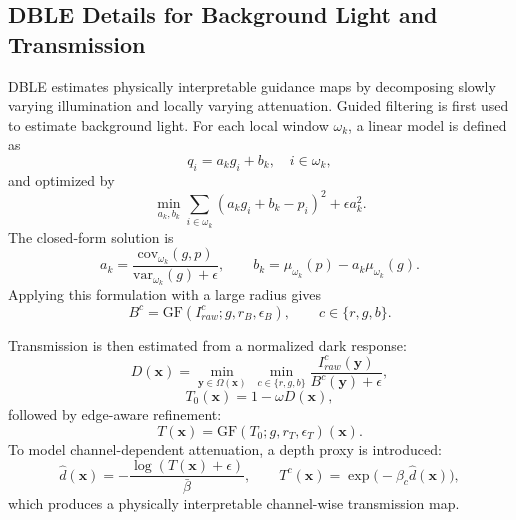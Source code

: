 \subsection{DBLE Details for Background Light and Transmission}
DBLE estimates physically interpretable guidance maps by decomposing slowly varying illumination and locally varying attenuation. Guided filtering is first used to estimate background light. For each local window $\omega_k$, a linear model is defined as
\begin{equation}
q_i = a_k g_i + b_k,\quad i\in\omega_k,
\end{equation}
and optimized by
\begin{equation}
\min_{a_k,b_k}\sum_{i\in\omega_k}(a_k g_i + b_k - p_i)^2 + \epsilon a_k^2.
\label{eq:supp_guided_obj}
\end{equation}
The closed-form solution is
\begin{equation}
a_k = \frac{\mathrm{cov}_{\omega_k}(g,p)}{\mathrm{var}_{\omega_k}(g)+\epsilon},\qquad
b_k = \mu_{\omega_k}(p) - a_k\mu_{\omega_k}(g).
\label{eq:supp_guided_ab}
\end{equation}
Applying this formulation with a large radius gives
\begin{equation}
B^c = \mathrm{GF}(I_{raw}^c; g, r_B, \epsilon_B),\qquad c\in\{r,g,b\}.
\label{eq:supp_dble_b}
\end{equation}

Transmission is then estimated from a normalized dark response:
\begin{equation}
D(\mathbf{x}) = \min_{\mathbf{y}\in\Omega(\mathbf{x})}\ \min_{c\in\{r,g,b\}} \frac{I_{raw}^{c}(\mathbf{y})}{B^{c}(\mathbf{y})+\epsilon},
\end{equation}
\begin{equation}
T_0(\mathbf{x}) = 1 - \omega D(\mathbf{x}),
\label{eq:supp_dble_t0}
\end{equation}
followed by edge-aware refinement:
\begin{equation}
T(\mathbf{x}) = \mathrm{GF}(T_0; g, r_T, \epsilon_T)(\mathbf{x}).
\label{eq:supp_dble_t}
\end{equation}
To model channel-dependent attenuation, a depth proxy is introduced:
\begin{equation}
\hat d(\mathbf{x}) = -\frac{\log(T(\mathbf{x})+\epsilon)}{\bar\beta},\qquad
T^c(\mathbf{x}) = \exp\bigl(-\beta_c\hat d(\mathbf{x})\bigr),
\label{eq:supp_dble_rgb_t}
\end{equation}
which produces a physically interpretable channel-wise transmission map.

